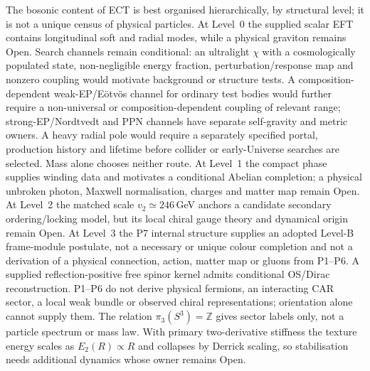 \documentclass[11pt,a4paper]{article}
\begin{document}
The bosonic content of ECT is best organised hierarchically, by structural
level; it is not a unique census of physical particles.  At Level~0 the
supplied scalar EFT contains longitudinal soft and radial modes, while a
physical graviton remains Open.  Search channels remain conditional: an
ultralight $\chi$ with a cosmologically populated state, non-negligible energy
fraction, perturbation/response map and nonzero coupling would motivate
background or structure tests.  A composition-dependent weak-EP/E\"otv\"os
channel for ordinary test bodies would further require a non-universal or
composition-dependent coupling of relevant range; strong-EP/Nordtvedt and PPN
channels have separate self-gravity and metric owners.  A heavy radial pole would require a separately specified portal, production
history and lifetime before collider or early-Universe searches are selected.
Mass alone chooses neither route.  At Level~1 the compact phase supplies
winding data and motivates a conditional Abelian completion; a physical
unbroken photon, Maxwell normalisation, charges and matter map remain Open.
At Level~2 the matched scale $v_2\simeq246$\,GeV anchors a candidate
secondary ordering/locking model, but its local chiral gauge theory and
dynamical origin remain Open.  At Level~3 the P7 internal structure supplies an adopted Level-B
frame-module postulate, not a necessary or unique colour completion and not
a derivation of a physical connection, action, matter map or gluons from P1--P6.
A supplied reflection-positive free spinor kernel admits conditional
OS/Dirac reconstruction.  P1--P6 do not derive physical fermions, an
interacting CAR sector, a local weak bundle or observed chiral
representations; orientation alone cannot supply them.  The relation
$\pi_3(S^3)=\mathbb{Z}$ gives sector labels only, not a particle spectrum or
mass law.  With primary two-derivative stiffness the texture energy scales as
$E_2(R)\propto R$ and collapses by Derrick scaling, so stabilisation needs
additional dynamics whose owner remains Open.
\end{document}
